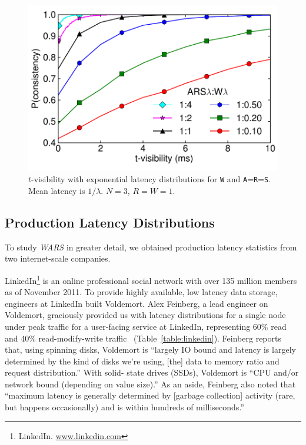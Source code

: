 \documentclass{vldb}
\newcommand{\subsectionskip}{-0em}
\begin{document}
\begin{figure}
\centering
\includegraphics[width=.85\columnwidth]{figs/rwratio.pdf}
\vspace{-14pt}
\caption{$t$-visibility with
  exponential latency distributions for 
  \texttt{W} and \texttt{A}=\texttt{R}=\texttt{S}. Mean latency is
  $1/\lambda$. $N$$=$$3$, $R$$=$$W$$=$$1$. }
\vspace{-12pt}
\label{fig:varydelay}
\end{figure}

\vspace{\subsectionskip}\subsection{Production Latency Distributions}
\label{sec:latencies}

To study \textit{WARS} in greater detail, we obtained production latency
statistics from two internet-scale companies.

LinkedIn\footnote{LinkedIn. \url{www.linkedin.com}} is an online
professional social network with over 135 million members as of
November 2011. To provide highly available, low latency data storage,
engineers at LinkedIn built Voldemort.  Alex Feinberg, a lead engineer
on Voldemort, graciously provided us with latency distributions for a
single node under peak traffic for a user-facing service at
LinkedIn, representing 60\% read and 40\% read-modify-write
traffic~\cite{feinbergpc} (Table~\ref{table:linkedin}).  Feinberg
reports that, using spinning disks, Voldemort is ``largely IO bound
and latency is largely determined by the kind of disks we're using,
[the] data to memory ratio and request distribution.''  With solid-
state drives (SSDs), Voldemort is ``CPU and/or network bound
(depending on value size).''  As an aside, Feinberg also
noted that ``maximum latency is generally determined by [garbage
  collection] activity (rare, but happens occasionally) and is within
hundreds of milliseconds.''
\end{document}
